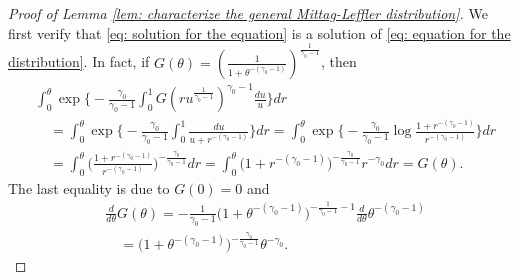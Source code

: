 \documentclass[12pt, a4paper]{amsart}
\theoremstyle{definition}
\numberwithin{equation}{section}
\begin{document}
\begin{proof}[Proof of Lemma \ref{lem: characterize the general Mittag-Leffler distribution}]
	
	We first verify that \eqref{eq: solution for the equation}  is a solution of \eqref{eq: equation for the distribution}.
	In fact, if $G(\theta) = (\frac{1}{1+ \theta^{-(\gamma_0 - 1)}})^{\frac{1}{\gamma_0 - 1}}$, then
\[\begin{split}
	 & \int_0^\theta \exp\Big\{- \frac{\gamma_0} {\gamma_0 - 1} \int_0^1 G(ru^{\frac{1}{\gamma_0 - 1}})^{\gamma_0 - 1}\frac{du}{u}\Big\} dr
	\\&\quad = \int_0^\theta \exp\Big\{- \frac{\gamma_0} {\gamma_0 - 1} \int_0^1 \frac{du}{u+r^{-(\gamma_0 - 1)}} \Big\} dr
	= \int_0^\theta \exp\Big\{- \frac{\gamma_0} {\gamma_0 - 1} \log\frac{1+r^{-(\gamma_0 - 1)}}{r^{-(\gamma_0 - 1)} } \Big\} dr
	\\&\quad = \int_0^\theta \big(\frac{1+r^{-(\gamma_0 - 1)}}{r^{-(\gamma_0 - 1)} }\big)^{- \frac{\gamma_0} {\gamma_0 - 1}} dr
	= \int_0^\theta \big( 1 + r^{ - ( \gamma_0 - 1 ) } \big)^{- \frac{\gamma_0} {\gamma_0 - 1}} r^{-\gamma_0} dr
	= G(\theta).
\end{split}\]
	The last equality is due to $G(0) = 0$ and
\[\begin{split}
	&\frac{d}{d\theta}G(\theta)
	= - \frac{1}{\gamma_0 - 1} \big(1+\theta^{-(\gamma_0 - 1)}\big)^{- \frac{1}{\gamma_0 - 1} - 1} \frac{d}{d\theta} \theta^{-(\gamma_0 - 1)}
	\\&\quad =  \big(1+\theta^{-(\gamma_0 - 1)}\big)^{- \frac{\gamma_0}{\gamma_0 - 1} } \theta^{-\gamma_0}.
\end{split}\]
	

\end{proof}
\end{document}

